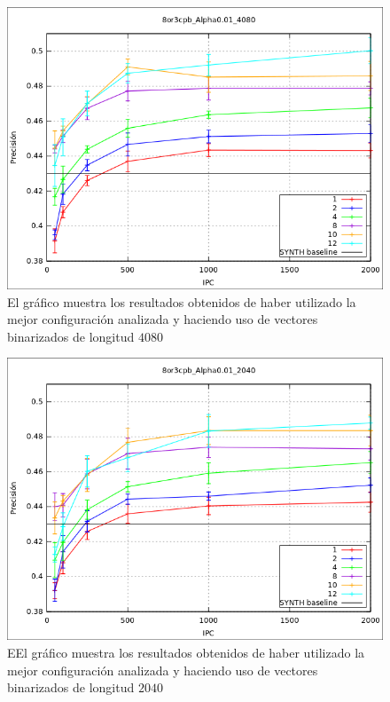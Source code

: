 			\begin{figure}[htbp]
				\centering
				\includegraphics[scale=0.6]{img/resultados/sinteticas/mean_4080.png}
				\caption[Sintéticas media 4080]{El gráfico muestra los resultados obtenidos de haber utilizado la mejor configuración analizada y haciendo uso de vectores binarizados de longitud $4080$}
				\label{fig: Sinteticas-media-4080}
			\end{figure}

			\begin{figure}[htbp]
				\centering
				\includegraphics[scale=0.6]{img/resultados/sinteticas/mean_2040.png}
				\caption[Sintéticas media 2040]{EEl gráfico muestra los resultados obtenidos de haber utilizado la mejor configuración analizada y haciendo uso de vectores binarizados de longitud $2040$}
				\label{fig: Sinteticas-media-2040}
			\end{figure}
			

